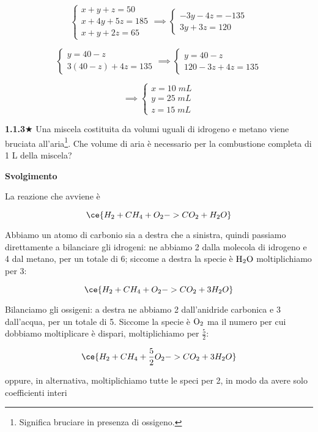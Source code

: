 $$\begin{cases}
    x+y+z=50\\
    x + 4y + 5z=185\\
    x+y+2z=65
\end{cases}
\implies
\begin{cases}
    -3y-4z=-135\\
    3y+3z=120
\end{cases}$$

$$\begin{cases}
    y=40-z\\
    3(40-z) + 4z=135
\end{cases}
\implies
\begin{cases}
    y=40-z\\
    120 - 3z + 4z=135
\end{cases}$$

$$\implies
\begin{cases}
    x=10\;mL\\
    y=25\;mL\\
    z=15\;mL
\end{cases}$$

\vspace{0.2cm}\textbf{1.1.3}$\bigstar$ Una miscela costituita da volumi uguali di idrogeno e metano viene bruciata all'aria\footnote{Significa bruciare in presenza di ossigeno.}. Che volume di aria è necessario per la combustione completa di 1 L della miscela?

\vspace{0.2cm}\large\textbf{Svolgimento}\normalsize

\vspace{0.2cm}La reazione che avviene è

$$\ce{H_2 + CH_4 + O_2 -> CO_2 + H_2O}$$

Abbiamo un atomo di carbonio sia a destra che a sinistra, quindi passiamo direttamente a bilanciare gli idrogeni: ne abbiamo 2 dalla molecola di idrogeno e 4 dal metano, per un totale di 6; siccome a destra la specie è $\rm H_2O$ moltiplichiamo per 3:

$$\ce{H_2 + CH_4 + O_2 -> CO_2 + 3H_2O}$$

Bilanciamo gli ossigeni: a destra ne abbiamo 2 dall'anidride carbonica e 3 dall'acqua, per un totale di 5. Siccome la specie è $\rm O_2$ ma il numero per cui dobbiamo moltiplicare è dispari, moltiplichiamo per $\frac{5}{2}$:

$$\ce{H_2 + CH_4 + \frac{5}{2}O_2 -> CO_2 + 3H_2O}$$

oppure, in alternativa, moltiplichiamo tutte le speci per 2, in modo da avere solo coefficienti interi

